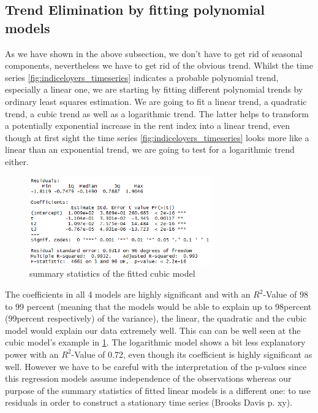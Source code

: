 \documentclass[11pt,a4paper]{article}
\begin{document}
\subsection{Trend Elimination by fitting polynomial models}
As we have shown in the above subsection, we don't have to get rid of seasonal components, nevertheless we have to get rid of the obvious trend. Whilst the time series \ref{fig:indiceloyers_timeseries} indicates a probable polynomial trend, especially a linear one, we are starting by fitting different polynomial trends by ordinary least squares estimation. We are going to fit a linear trend, a quadratic trend, a cubic trend as well as a logarithmic trend. The latter  helps to transform a potentially exponential increase in the rent index into a linear trend, even though at first sight the time series \ref{fig:indiceloyers_timeseries} looks more like a linear than an exponential trend, we are going to test for a logarithmic trend either.
\\
\begin{figure}[!htb]
\centering
\includegraphics[angle=0,
width=0.7\textwidth]{summary_cubicmodel}
\caption{summary statistics of the fitted cubic model\label{fig:summary_cubicmodel}}
\end{figure}
The coefficients in all 4 models are highly significant and with an $R^2$-Value of 98 to 99 percent (meaning that the models would be able to explain up to 98percent (99percent respectively) of the variance), the linear, the quadratic and the cubic model would explain our data extremely well. This can can be well seen at the cubic model's example in \ref{fig:summary_cubicmodel}. The logarithmic model shows a bit less explanatory power with an $R^2$-Value of 0.72, even though its coefficient is highly significant as well. However we have to be careful with the interpretation of the p-values since this regression models assume independence of the observations whereas our purpose of the summary statistics of fitted linear models is a different one: to use residuals in order to construct a stationary time series (Brooks Davis p. xy). 
\end{document}
